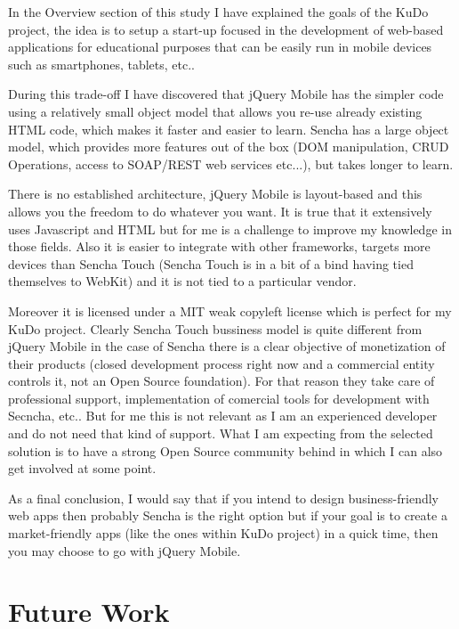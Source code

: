 \documentclass[a4paper,12pt]{book}
\begin{document}
In the Overview section of this study I have explained the goals of the KuDo project, the idea is to setup a start-up focused in the development of web-based applications for educational purposes that can be easily run in mobile devices such as smartphones, tablets, etc..

During this trade-off I have discovered that jQuery Mobile has the simpler code using a relatively small object model that allows you re-use already existing HTML code, which makes it faster and easier to learn. Sencha has a large object model, which provides more features out of the box (DOM manipulation, CRUD Operations, access to SOAP/REST web services etc...), but takes longer to learn.

There is no established architecture, jQuery Mobile is layout-based and this allows you the freedom to do whatever you want. It is true that it extensively uses Javascript and HTML but for me is a challenge to improve my knowledge in those fields. Also it is easier to integrate with other frameworks, targets more devices than Sencha Touch (Sencha Touch is in a bit of a bind having tied themselves to WebKit) and it is not tied to a particular vendor.

Moreover it is licensed under a MIT weak copyleft license which is perfect for my KuDo project. Clearly Sencha Touch bussiness model is quite different from jQuery Mobile in the case of Sencha there is a clear objective of monetization of their products (closed development process right now and a commercial entity controls it, not an Open Source foundation). For that reason they take care of professional support, implementation of comercial tools for development with Secncha, etc.. But for me this is not relevant as I am an experienced developer and do not need that kind of support. What I am expecting from the selected solution is to have a strong Open Source community behind in which I can also get involved at some point.

As a final conclusion, I would say that if you intend to design business-friendly web apps then probably Sencha is the right option but if your goal is to create a market-friendly apps (like the ones within KuDo project) in a quick time, then you may choose to go with jQuery Mobile.


\chapter{Future Work}
\label{chap:future}
\end{document}
